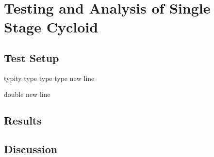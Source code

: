 
\chapter{Testing and Analysis of Single Stage Cycloid}\label{ch:single}


\section{Test Setup} \label{single:test_setupd}

typity type type type
new line

double new line 

\section{Results} \label{single:results}

\section{Discussion} \label{single:discussion}
